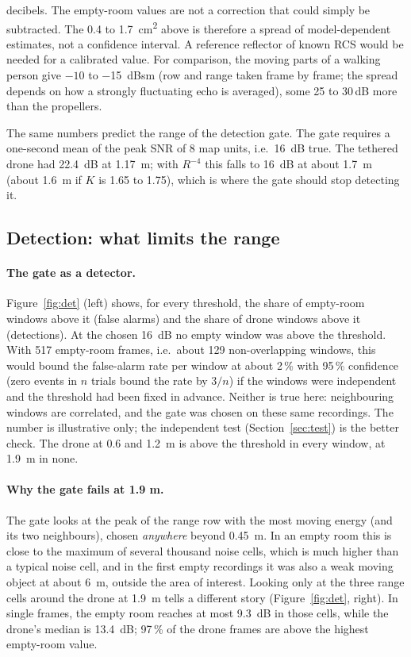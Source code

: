 \documentclass[11pt,a4paper]{article}
\begin{document}
decibels. The empty-room values are not a correction that could simply be subtracted. The 0.4 to \SI{1.7}{cm^2} above is therefore a spread of model-dependent estimates, not a confidence interval. A reference reflector of known RCS would be needed for a calibrated value. For comparison, the moving parts of a walking person give $-10$ to \SI{-15}{dBsm} (row and range taken frame by frame; the spread depends on how a strongly fluctuating echo is averaged), some 25 to 30\,dB more than the propellers.

The same numbers predict the range of the detection gate. The gate requires a one-second mean of the peak SNR of 8 map units, i.e.\ \SI{16}{dB} true. The tethered drone had \SI{22.4}{dB} at \SI{1.17}{m}; with $R^{-4}$ this falls to \SI{16}{dB} at about \SI{1.7}{m} (about \SI{1.6}{m} if $K$ is 1.65 to 1.75), which is where the gate should stop detecting it.

\subsection{Detection: what limits the range}\label{sec:det}

\paragraph{The gate as a detector.} Figure~\ref{fig:det} (left) shows, for every threshold, the share of empty-room windows above it (false alarms) and the share of drone windows above it (detections). At the chosen \SI{16}{dB} no empty window was above the threshold. With 517 empty-room frames, i.e.\ about 129 non-overlapping windows, this would bound the false-alarm rate per window at about 2\,\% with 95\,\% confidence (zero events in $n$ trials bound the rate by $3/n$) if the windows were independent and the threshold had been fixed in advance. Neither is true here: neighbouring windows are correlated, and the gate was chosen on these same recordings. The number is illustrative only; the independent test (Section~\ref{sec:test}) is the better check. The drone at 0.6 and \SI{1.2}{m} is above the threshold in every window, at \SI{1.9}{m} in none.

\paragraph{Why the gate fails at 1.9 m.} The gate looks at the peak of the range row with the most moving energy (and its two neighbours), chosen \emph{anywhere} beyond \SI{0.45}{m}. In an empty room this is close to the maximum of several thousand noise cells, which is much higher than a typical noise cell, and in the first empty recordings it was also a weak moving object at about \SI{6}{m}, outside the area of interest. Looking only at the three range cells around the drone at \SI{1.9}{m} tells a different story (Figure~\ref{fig:det}, right). In single frames, the empty room reaches at most \SI{9.3}{dB} in those cells, while the drone's median is \SI{13.4}{dB}; 97\,\% of the drone frames are above the highest empty-room value.
\end{document}
